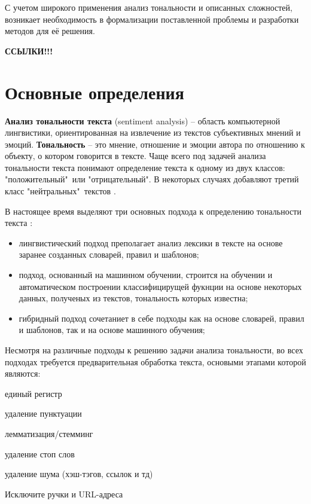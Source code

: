 С учетом широкого применения анализ тональности и описанных сложностей,
возникает необходимость в формализации поставленной проблемы и разработки
методов для её решения.

\textbf{ССЫЛКИ!!!}

\section{Основные определения}

\textbf{Анализ тональности текста} (sentiment analysis) -- область компьютерной
лингвистики, ориентированная на извлечение из текстов субъективных мнений и
эмоций. \textbf{Тональность} -- это мнение, отношение и эмоции автора по
отношению к объекту, о котором говорится в тексте.  Чаще всего под задачей
анализа тональности текста понимают определение текста к одному из двух классов:
"положительный"\ или "отрицательный". В некоторых случаях добавляют третий класс
"нейтральных"\ текстов \cite{article9}.

В настоящее время выделяют три основных подхода к определению тональности
текста \cite{article9}:
\begin{itemize}
    \item лингвистический подход преполагает анализ лексики в тексте на основе
        заранее созданных словарей, правил и шаблонов;

    \item подход, основанный на машинном обучении, строится на обучении и
        автоматическом построении классифицирущей фукнции на основе
        некоторых данных, полученых из текстов, тональность которых
        известна;

    \item гибридный подход сочетаниет в себе подходы как на основе словарей,
        правил и шаблонов, так и на основе машинного обучения;
\end{itemize}

\cite{Pradha2019EffectiveTD}
Несмотря на различные подходы к решению задачи анализа тональности, во всех
подходах требуется предварительная обработка текста, основыми этапами которой
являются:

единый регистр

удаление пунктуации

лемматизация/стемминг

удаление стоп слов

удаление шума (хэш-тэгов, ссылок и тд)

Исключите ручки и URL-адреса

